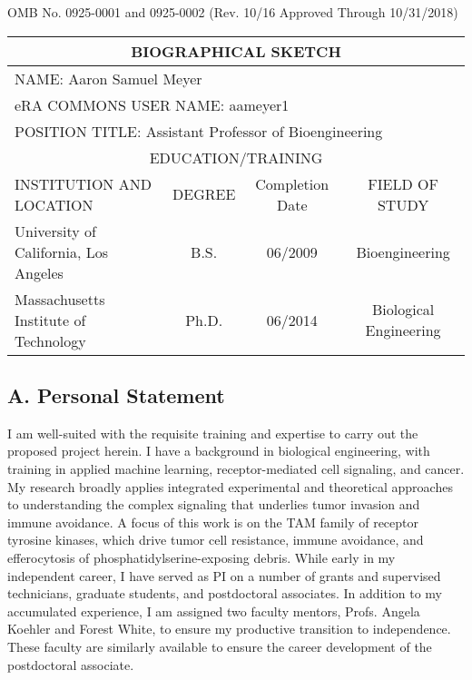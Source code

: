 \documentclass[11pt]{article}
\begin{document}
\setlength\parindent{0pt}

\renewcommand{\arraystretch}{1.2}

\begin{flushright}
\footnotesize
	OMB No. 0925-0001 and 0925-0002 (Rev. 10/16 Approved Through 10/31/2018)
\end{flushright}


\begin{tabular}{l|c|c|c}
  \hline
  \multicolumn{4}{c}{\textbf{BIOGRAPHICAL SKETCH}} \\
  \hline
  \multicolumn{4}{l}{NAME: Aaron Samuel Meyer} \\
  \hline
  \multicolumn{4}{l}{eRA COMMONS USER NAME: aameyer1} \\
  \hline
  \multicolumn{4}{l}{POSITION TITLE: Assistant Professor of Bioengineering} \\
  \hline
  \multicolumn{4}{c}{EDUCATION/TRAINING} \\
  \hline
  INSTITUTION AND LOCATION & DEGREE & Completion Date & FIELD OF STUDY \\
  \hline
  University of California, Los Angeles & B.S. & 06/2009 & Bioengineering \\
  Massachusetts Institute of Technology & Ph.D. & 06/2014 & Biological Engineering \\
  
\end{tabular}


\vspace{20pt}

\subsection{A. Personal Statement}


I am well-suited with the requisite training and expertise to carry out the proposed project herein. I have a background in biological engineering, with training in applied machine learning, receptor-mediated cell signaling, and cancer. My research broadly applies integrated experimental and theoretical approaches to understanding the complex signaling that underlies tumor invasion and immune avoidance. A focus of this work is on the TAM family of receptor tyrosine kinases, which drive tumor cell resistance, immune avoidance, and efferocytosis of phosphatidylserine-exposing debris. While early in my independent career, I have served as PI on a number of grants and supervised technicians, graduate students, and postdoctoral associates. In addition to my accumulated experience, I am assigned two faculty mentors, Profs. Angela Koehler and Forest White, to ensure my productive transition to independence. These faculty are similarly available to ensure the career development of the postdoctoral associate.
\end{document}
